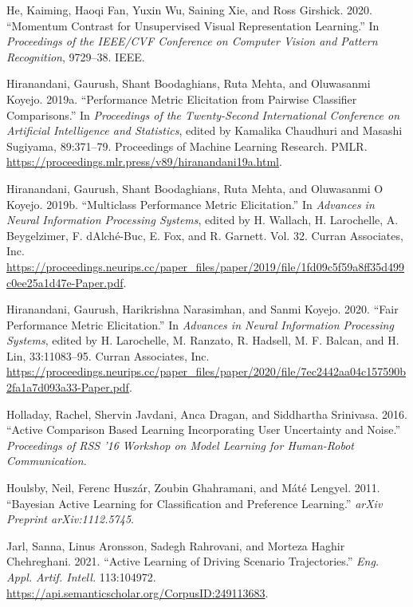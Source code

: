 \documentclass[
  letterpaper,
  numbers=noenddot,
  DIV=11]{scrreprt}
\newlength{\cslhangindent}
\newenvironment{CSLReferences}[2] %
 {\begin{list}{}{%
  \setlength{\itemindent}{0pt}
  \setlength{\leftmargin}{0pt}
  \setlength{\parsep}{0pt}
  \ifodd #1
   \setlength{\leftmargin}{\cslhangindent}
   \setlength{\itemindent}{-1\cslhangindent}
  \fi
  \setlength{\itemsep}{#2\baselineskip}}}
 {\end{list}}
\theoremstyle{definition}
\theoremstyle{plain}
\theoremstyle{plain}
\theoremstyle{remark}
\begin{document}
\begin{CSLReferences}{1}{0}
He, Kaiming, Haoqi Fan, Yuxin Wu, Saining Xie, and Ross Girshick. 2020.
{``Momentum Contrast for Unsupervised Visual Representation Learning.''}
In \emph{Proceedings of the IEEE/CVF Conference on Computer Vision and
Pattern Recognition}, 9729--38. IEEE.

Hiranandani, Gaurush, Shant Boodaghians, Ruta Mehta, and Oluwasanmi
Koyejo. 2019a. {``Performance Metric Elicitation from Pairwise
Classifier Comparisons.''} In \emph{Proceedings of the Twenty-Second
International Conference on Artificial Intelligence and Statistics},
edited by Kamalika Chaudhuri and Masashi Sugiyama, 89:371--79.
Proceedings of Machine Learning Research. PMLR.
\url{https://proceedings.mlr.press/v89/hiranandani19a.html}.

Hiranandani, Gaurush, Shant Boodaghians, Ruta Mehta, and Oluwasanmi O
Koyejo. 2019b. {``Multiclass Performance Metric Elicitation.''} In
\emph{Advances in Neural Information Processing Systems}, edited by H.
Wallach, H. Larochelle, A. Beygelzimer, F. dAlché-Buc, E. Fox, and R.
Garnett. Vol. 32. Curran Associates, Inc.
\url{https://proceedings.neurips.cc/paper_files/paper/2019/file/1fd09c5f59a8ff35d499c0ee25a1d47e-Paper.pdf}.

Hiranandani, Gaurush, Harikrishna Narasimhan, and Sanmi Koyejo. 2020.
{``Fair Performance Metric Elicitation.''} In \emph{Advances in Neural
Information Processing Systems}, edited by H. Larochelle, M. Ranzato, R.
Hadsell, M. F. Balcan, and H. Lin, 33:11083--95. Curran Associates, Inc.
\url{https://proceedings.neurips.cc/paper_files/paper/2020/file/7ec2442aa04c157590b2fa1a7d093a33-Paper.pdf}.

Holladay, Rachel, Shervin Javdani, Anca Dragan, and Siddhartha
Srinivasa. 2016. {``Active Comparison Based Learning Incorporating User
Uncertainty and Noise.''} \emph{Proceedings of RSS '16 Workshop on Model
Learning for Human-Robot Communication}.

Houlsby, Neil, Ferenc Huszár, Zoubin Ghahramani, and Máté Lengyel. 2011.
{``Bayesian Active Learning for Classification and Preference
Learning.''} \emph{arXiv Preprint arXiv:1112.5745}.

Jarl, Sanna, Linus Aronsson, Sadegh Rahrovani, and Morteza Haghir
Chehreghani. 2021. {``Active Learning of Driving Scenario
Trajectories.''} \emph{Eng. Appl. Artif. Intell.} 113:104972.
\url{https://api.semanticscholar.org/CorpusID:249113683}.


\end{CSLReferences}
\end{document}
